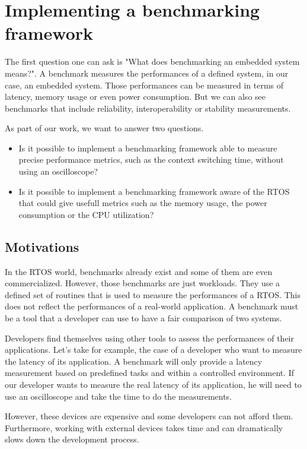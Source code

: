 \section{Implementing a benchmarking framework}

The first question one can ask is "What does benchmarking an embedded system means?".
A benchmark measures the performances of a defined system, in our case, an embedded system.
Those performances can be measured in terms of latency, memory usage or even power consumption.
But we can also see benchmarks that include reliability, interoperability or stability measurements.

As part of our work, we want to answer two questions.

\begin{itemize}
  \item Is it possible to implement a benchmarking framework able to measure precise performance metrics, such as the context switching time, without using an oscilloscope?
  \item Is it possible to implement a benchmarking framework aware of the RTOS that could give usefull metrics such as the memory usage, the power consumption or the CPU utilization? %
\end{itemize}

\subsection{Motivations}

In the RTOS world, benchmarks already exist and some of them are even commercialized. \cite{mibench, parmibench, performance-benchmarking}
However, those benchmarks are just workloads.
They use a defined set of routines that is used to measure the performances of a RTOS.
This does not reflect the performances of a real-world application.
A benchmark must be a tool that a developer can use to have a fair comparison of two systems.

Developers find themselves using other tools to assess the performances of their applications.
Let's take for example, the case of a developer who want to measure the latency of its application.
A benchmark will only provide a latency measurement based on predefined tasks and within a controlled environment.
If our developer wants to measure the real latency of its application, he will need to use an oscilloscope and take the time to do the measurements.

However, these devices are expensive and some developers can not afford them.
Furthermore, working with external devices takes time and can dramatically slows down the development process.

